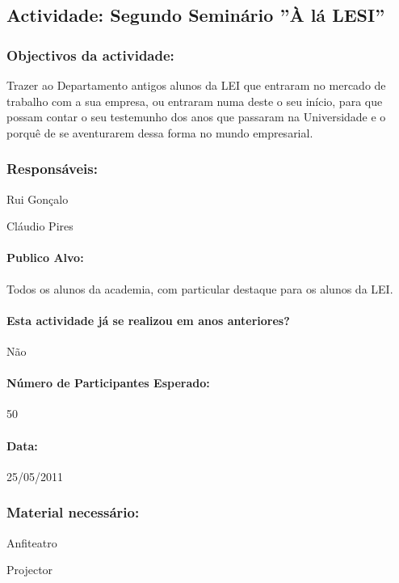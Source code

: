 \subsection{Actividade: Segundo Seminário ''À lá LESI''} %

\subsubsection*{Objectivos da actividade:}
Trazer ao Departamento antigos alunos da LEI que entraram no mercado de trabalho com a sua empresa, ou entraram numa deste o seu início, para que possam contar o seu testemunho dos anos que passaram na Universidade e o porquê de se aventurarem dessa forma no mundo empresarial.

\subsubsection*{Responsáveis:}
\begin{itemizedash}
	\item{Rui Gonçalo}
	\item{Cláudio Pires}
\end{itemizedash}

\paragraph{Publico Alvo: }
Todos os alunos da academia, com particular destaque para os alunos da LEI.

\paragraph{Esta actividade já se realizou em anos anteriores?}
Não

\paragraph{Número de Participantes Esperado:}
50

\paragraph{Data:} 25/05/2011

\subsubsection*{Material necessário:}
\begin{itemizedash}
	\item{Anfiteatro}
	\item{Projector}
\end{itemizedash}

